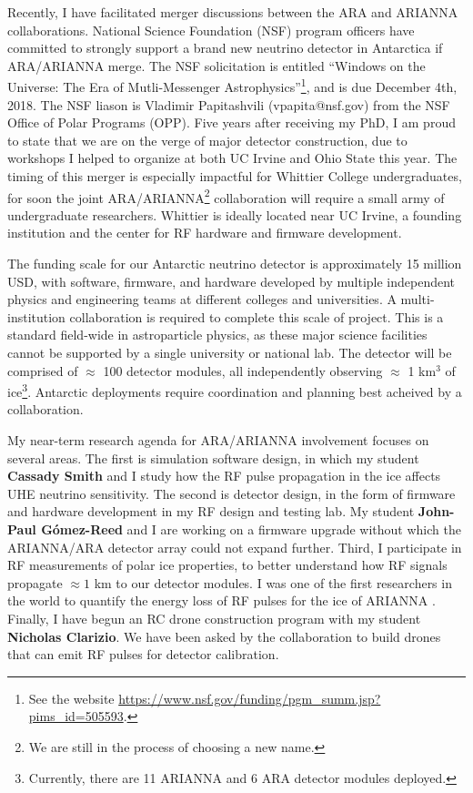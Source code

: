 \documentclass[../../main.tex]{subfiles}
\begin{document}
Recently, I have facilitated merger discussions between the ARA and ARIANNA collaborations.  National Science Foundation (NSF) program officers have committed to strongly support a brand new neutrino detector in Antarctica if ARA/ARIANNA merge.  The NSF solicitation is entitled ``Windows on the Universe: The Era of Mutli-Messenger Astrophysics''\footnote{See the website \url{https://www.nsf.gov/funding/pgm_summ.jsp?pims_id=505593}.}, and is due December 4th, 2018.  The NSF liason is Vladimir Papitashvili (vpapita@nsf.gov) from the NSF Office of Polar Programs (OPP).  Five years after receiving my PhD, I am proud to state that we are on the verge of major detector construction, due to workshops I helped to organize at both UC Irvine and Ohio State this year.  The timing of this merger is especially impactful for Whittier College undergraduates, for soon the joint ARA/ARIANNA\footnote{We are still in the process of choosing a new name.} collaboration will require a small army of undergraduate researchers. Whittier is ideally located near UC Irvine, a founding institution and the center for RF hardware and firmware development. \\ \hspace{0.1cm}

The funding scale for our Antarctic neutrino detector is approximately 15 million USD, with software, firmware, and hardware developed by multiple independent physics and engineering teams at different colleges and universities.  A multi-institution collaboration is required to complete this scale of project.  This is a standard field-wide in astroparticle physics, as these major science facilities cannot be supported by a single university or national lab.  The detector will be comprised of $\approx$ 100 detector modules, all independently observing $\approx$ 1 km$^3$ of ice\footnote{Currently, there are 11 ARIANNA and 6 ARA detector modules deployed.}.  Antarctic deployments require coordination and planning best acheived by a collaboration. \\ \hspace{0.1cm}

My near-term research agenda for ARA/ARIANNA involvement focuses on several areas.  The first is simulation software design, in which my student \textbf{Cassady Smith} and I study how the RF pulse propagation in the ice affects UHE neutrino sensitivity.  The second is detector design, in the form of firmware and hardware development in my RF design and testing lab.  My student \textbf{John-Paul G\'{o}mez-Reed} and I are working on a firmware upgrade without which the ARIANNA/ARA detector array could not expand further.  Third, I participate in RF measurements of polar ice properties, to better understand how RF signals propagate $\approx 1$ km to our detector modules.  I was one of the first researchers in the world to quantify the energy loss of RF pulses for the ice of ARIANNA \cite{hanson2015}. Finally, I have begun an RC drone construction program with my student \textbf{Nicholas Clarizio}.  We have been asked by the collaboration to build drones that can emit RF pulses for detector calibration.  \\ \hspace{0.1cm}
\end{document}
